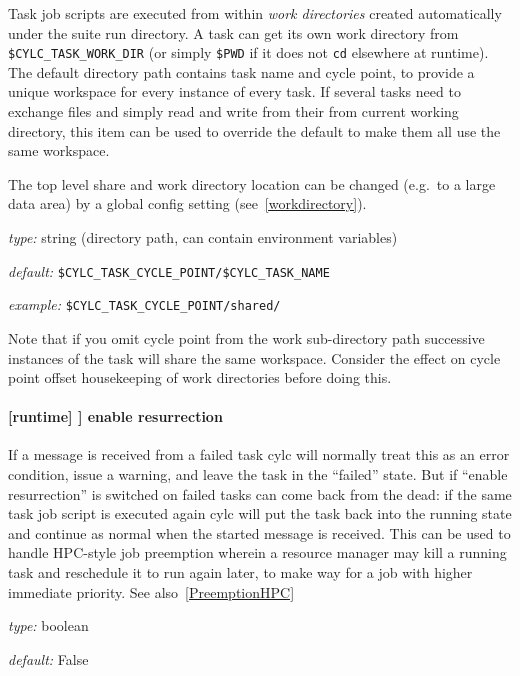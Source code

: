 Task job scripts are executed from within {\em work directories} created
automatically under the suite run directory. A task can get its own work
directory from \lstinline=$CYLC_TASK_WORK_DIR= (or simply \lstinline=$PWD= if
it does not \lstinline=cd= elsewhere at runtime). The default directory
path contains task name and cycle point, to provide a unique workspace for
every instance of every task. If several tasks need to exchange files and
simply read and write from their from current working directory, this item
can be used to override the default to make them all use the same workspace.

The top level share and work directory location can be changed (e.g.\ to a
large data area) by a global config setting (see~\ref{workdirectory}).

\begin{myitemize}
\item {\em type:} string (directory path, can contain environment variables)
\item {\em default:} \lstinline=$CYLC_TASK_CYCLE_POINT/$CYLC_TASK_NAME=
\item {\em example:} \lstinline=$CYLC_TASK_CYCLE_POINT/shared/=
\end{myitemize}

Note that if you omit cycle point from the work sub-directory path successive
instances of the task will share the same workspace.  Consider the effect on
cycle point offset housekeeping of work directories before doing this.

\paragraph[enable resurrection]{ [runtime] \textrightarrow [[\_\_NAME\_\_]] \textrightarrow enable resurrection}

If a message is received from a failed task cylc will normally treat
this as an error condition, issue a warning, and leave the task in the
``failed'' state.  But if ``enable resurrection'' is switched on failed
tasks can come back from the dead: if the same task job script is
executed again cylc will put the task back into the running state and
continue as normal when the started message is received. This can be
used to handle HPC-style job preemption wherein a resource manager may
kill a running task and reschedule it to run again later, to make way
for a job with higher immediate priority. See also~\ref{PreemptionHPC}
\begin{myitemize}
\item {\em type:} boolean
\item {\em default:} False
\end{myitemize}


